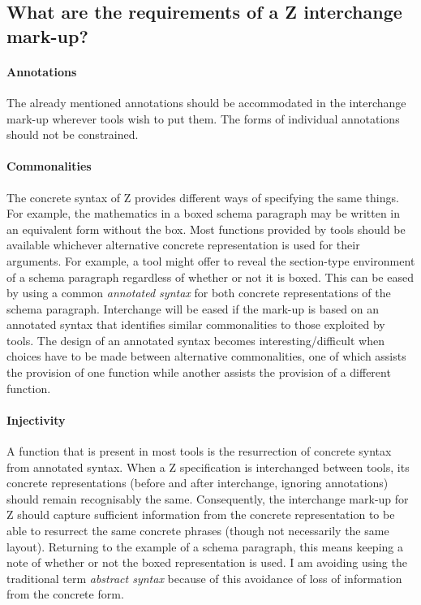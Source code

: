 \documentclass[a4paper,10pt]{article}
\begin{document}
\subsection{What are the requirements of a Z interchange mark-up?}\label{injectivity}

\paragraph{Annotations}
The already mentioned annotations should be accommodated
in the interchange mark-up wherever tools wish to put them.
The forms of individual annotations should not be constrained.

\paragraph{Commonalities}
The concrete syntax of Z provides different ways of specifying the same things.
For example, the mathematics in a boxed schema paragraph
may be written in an equivalent form without the box.
Most functions provided by tools should be available
whichever alternative concrete representation is used for their arguments.
For example, a tool might offer to reveal the section-type environment
of a schema paragraph regardless of whether or not it is boxed.
This can be eased by using a common \textit{annotated syntax}
for both concrete representations of the schema paragraph.
Interchange will be eased if the mark-up is based on an annotated syntax
that identifies similar commonalities to those exploited by tools.
The design of an annotated syntax becomes interesting/difficult
when choices have to be made between alternative commonalities,
one of which assists the provision of one function
while another assists the provision of a different function.

\paragraph{Injectivity}
A function that is present in most tools
is the resurrection of concrete syntax from annotated syntax.
When a Z specification is interchanged between tools,
its concrete representations
(before and after interchange, ignoring annotations)
should remain recognisably the same.
Consequently, the interchange mark-up for Z should capture
sufficient information from the concrete representation 
to be able to resurrect the same concrete phrases
(though not necessarily the same layout).
Returning to the example of a schema paragraph,
this means keeping a note of whether or not the boxed representation is used.
I am avoiding using the traditional term \textit{abstract syntax}
because of this avoidance of loss of information from the concrete form.
\end{document}
